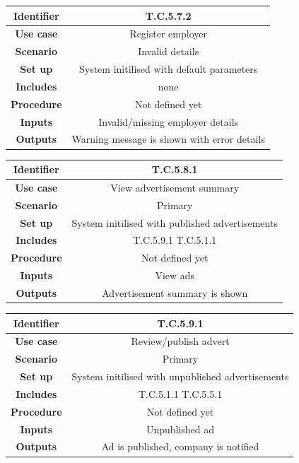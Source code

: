 \documentclass{l3deliverable}
\begin{document}
\begin{tabular}{|c|c|}
\hline \textbf{Identifier} & T.C.5.7.2\\
\hline \textbf{Use case} & Register employer\\
\hline \textbf{Scenario} & Invalid details\\
\hline \textbf{Set up} & System initilised with default parameters\\
\hline \textbf{Includes} & none\\
\hline \textbf{Procedure} & Not defined yet\\
\hline \textbf{Inputs} & Invalid/missing employer details\\
\hline \textbf{Outputs} & Warning message is shown with error details\\
\hline
\end{tabular}

\begin{tabular}{|c|c|}
\hline \textbf{Identifier} & T.C.5.8.1\\
\hline \textbf{Use case} & View advertisement summary\\
\hline \textbf{Scenario} & Primary\\
\hline \textbf{Set up} & System initilised with published advertisements\\
\hline \textbf{Includes} & T.C.5.9.1 T.C.5.1.1\\
\hline \textbf{Procedure} & Not defined yet\\
\hline \textbf{Inputs} & View ads\\
\hline \textbf{Outputs} & Advertisement summary is shown\\
\hline
\end{tabular}

\begin{tabular}{|c|c|}
\hline \textbf{Identifier} & T.C.5.9.1\\
\hline \textbf{Use case} & Review/publish advert\\
\hline \textbf{Scenario} & Primary\\
\hline \textbf{Set up} & System initilised with unpublished advertisements\\
\hline \textbf{Includes} & T.C.5.1.1 T.C.5.5.1\\
\hline \textbf{Procedure} & Not defined yet\\
\hline \textbf{Inputs} & Unpublished ad\\
\hline \textbf{Outputs} & Ad is published, company is notified\\
\hline
\end{tabular}
\end{document}
